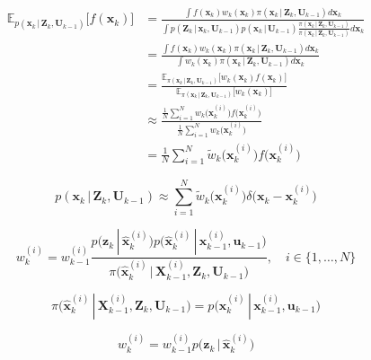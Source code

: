 \begin{equation}
\begin{split}
  \mathbb{E}_{p(\bm{x}_k\,|\,\bm{Z}_{k}, \bm{U}_{k-1})}\big[f(\bm{x}_k)\big] &= \frac{\int f(\bm{x}_k) w_k(\bm{x}_k) \pi(\bm{x}_k\,|\,\bm{Z}_{k}, \bm{U}_{k-1}) d\bm{x}_k}{\int p(\bm{Z}_k\,|\,\bm{x}_{k}, \bm{U}_{k-1}) p(\bm{x}_{k}\,|\,\bm{U}_{k-1}) \frac{\pi(\bm{x}_k\,|\,\bm{Z}_{k}, \bm{U}_{k-1})}{\pi(\bm{x}_k\,|\,\bm{Z}_{k}, \bm{U}_{k-1})}d\bm{x}_{k}} \\
  &= \frac{\int f(\bm{x}_k) w_k(\bm{x}_k) \pi(\bm{x}_k\,|\,\bm{Z}_{k}, \bm{U}_{k-1}) d\bm{x}_k}{\int w_k(\bm{x}_k) \pi(\bm{x}_k\,|\,\bm{Z}_{k}, \bm{U}_{k-1})d\bm{x}_{k}} \\
  &= \frac{\mathbb{E}_{\pi(\bm{x}_k\,|\,\bm{Z}_{k}, \bm{U}_{k-1})}\big[w_k(\bm{x}_k)f(\bm{x}_k)\big]}{\mathbb{E}_{\pi(\bm{x}_k\,|\,\bm{Z}_{k}, \bm{U}_{k-1})}\big[w_k(\bm{x}_k)\big]} \\
  &\approx \frac{\frac{1}{N} \sum^N_{i = 1} w_k\Big(\bm{x}^{(i)}_k\Big)f\Big(\bm{x}^{(i)}_k\Big)}{\frac{1}{N} \sum^N_{i = 1} w_k\Big(\bm{x}^{(i)}_k\Big)} \\
  &= \frac{1}{N} \sum^N_{i = 1} \tilde{w}_k\Big(\bm{x}^{(i)}_k\Big)f\Big(\bm{x}^{(i)}_k\Big)
\end{split}
\end{equation}

\begin{equation}
  p(\bm{x}_k\,|\,\bm{Z}_{k}, \bm{U}_{k-1}) \approx \sum^N_{i = 1} \tilde{w}_k\Big(\bm{x}^{(i)}_k\Big) \delta\Big(\bm{x}_{k} - \bm{x}^{(i)}_k \Big)
\end{equation}

\begin{equation}\label{eq:weights_generic_particle}
   w^{(i)}_k = w^{(i)}_{k-1} \frac{p\big(\bm{z}_k\,|\,\hat{\bm{x}}^{(i)}_k\big) p\big(\hat{\bm{x}}^{(i)}_k\,|\,\bm{x}^{(i)}_{k-1}, \bm{u}_{k-1}\big)}{\pi\big(\hat{\bm{x}}^{(i)}_k\,|\,\bm{X}^{(i)}_{k-1}, \bm{Z}_{k}, \bm{U}_{k-1}\big)}, \quad i \in \{1, \dots, N\}
\end{equation}


\begin{equation}
  \pi\big(\hat{\bm{x}}^{(i)}_k\,|\,\bm{X}^{(i)}_{k-1}, \bm{Z}_{k}, \bm{U}_{k-1}\big) = p\big(\bm{x}^{(i)}_k\,|\,\bm{x}^{(i)}_{k-1}, \bm{u}_{k-1}\big)
\end{equation}



\begin{equation}
  w^{(i)}_k = w^{(i)}_{k-1} p\big(\bm{z}_k\,|\,\hat{\bm{x}}^{(i)}_k\big)
\end{equation}


